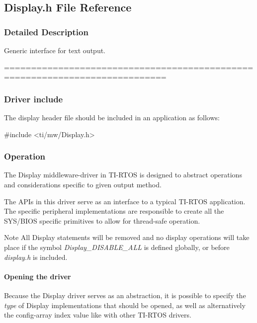 \subsection{Display.\+h File Reference}
\label{_display_8h}


\subsubsection{Detailed Description}
Generic interface for text output. 

============================================================================

\subsubsection*{Driver include}

The display header file should be included in an application as follows\+: 
\begin{DoxyCode}
\textcolor{preprocessor}{#include <ti/mw/Display.h>}
\end{DoxyCode}


\subsubsection*{Operation}

The Display middleware-\/driver in T\+I-\/\+R\+T\+O\+S is designed to abstract operations and considerations specific to given output method.

The A\+P\+Is in this driver serve as an interface to a typical T\+I-\/\+R\+T\+O\+S application. The specific peripheral implementations are responsible to create all the S\+Y\+S/\+B\+I\+O\+S specific primitives to allow for thread-\/safe operation.

\begin{DoxyNote}{Note}
All Display statements will be removed and no display operations will take place if the symbol {\itshape Display\+\_\+\+D\+I\+S\+A\+B\+L\+E\+\_\+\+A\+L\+L} is defined globally, or before {\itshape display.\+h} is included.
\end{DoxyNote}
\paragraph*{Opening the driver}

Because the Display driver serves as an abstraction, it is possible to specify the {\itshape type} of Display implementations that should be opened, as well as alternatively the config-\/array index value like with other T\+I-\/\+R\+T\+O\+S drivers.

